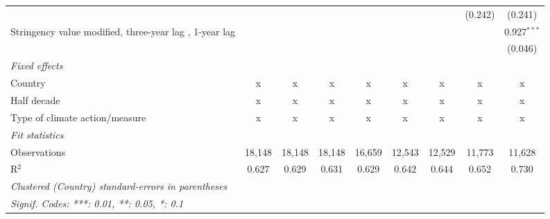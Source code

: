 \begin{table}[htbp]
\begin{tabular}{lcccccccc}
                                                                                                   &                &              &               &               &               &               & (0.242)       & (0.241)\\   
      Stringency value modified, three-year lag , 1-year lag                                       &                &              &               &               &               &               &               & 0.927$^{***}$\\   
                                                                                                   &                &              &               &               &               &               &               & (0.046)\\   
      \emph{Fixed effects}\\
      Country                                                                                      & x              & x            & x             & x             & x             & x             & x             & x\\  
      Half decade                                                                                  & x              & x            & x             & x             & x             & x             & x             & x\\  
      Type of climate action/measure                                                               & x              & x            & x             & x             & x             & x             & x             & x\\  
      \midrule \emph{Fit statistics}\\
      Observations                                                                                 & 18,148         & 18,148       & 18,148        & 16,659        & 12,543        & 12,529        & 11,773        & 11,628\\  
      R$^2$                                                                                        & 0.627          & 0.629        & 0.631         & 0.629         & 0.642         & 0.644         & 0.652         & 0.730\\  
      \midrule
      \multicolumn{9}{l}{\emph{Clustered (Country) standard-errors in parentheses}}\\
      \multicolumn{9}{l}{\emph{Signif. Codes: ***: 0.01, **: 0.05, *: 0.1}}\\
   \end{tabular}
\end{table}


